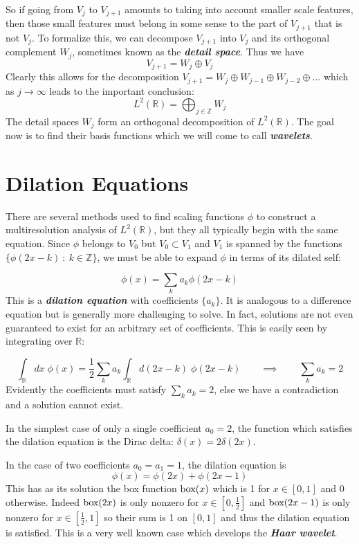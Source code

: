 \documentclass[onecolumn]{gwclass}
\begin{document}
So if going from $V_j$ to $V_{j+1}$ amounts to taking into account smaller scale features, then those small features must belong in some sense to the part of $V_{j+1}$ that is not $V_j$. To formalize this, we can decompose $V_{j+1}$ into $V_j$ and its orthogonal complement $W_j$, sometimes known as the \textbf{\emph{detail space}}. Thus we have
$$V_{j+1}=W_j\oplus V_j$$
Clearly this allows for the decomposition $V_{j+1} = W_j\oplus W_{j-1}\oplus W_{j-2}\oplus\dots$ which as $j\to\infty$ leads to the important conclusion:
$$ L^2(\mathbb{R}) = \bigoplus_{j\in\mathbb{Z}} W_j $$
The detail spaces $W_j$ form an orthogonal decomposition of $L^2(\mathbb{R})$. The goal now is to find their basis functions which we will come to call \textbf{\emph{wavelets}}. 




\section{Dilation Equations}
There are several methods used to find scaling functions $\phi$ to construct a multiresolution analysis of $L^2(\mathbb{R})$, but they all typically begin with the same equation. Since $\phi$ belongs to $V_0$ but $V_0\subset V_1$ and $V_1$ is spanned by the functions $\{\phi(2x-k)\::\:k\in\mathbb{Z}\}$, we must be able to expand $\phi$ in terms of its dilated self:

	$$\phi(x) = \sum_k a_k \phi(2x - k)$$
This is a \textbf{\emph{dilation equation}} with coefficients $\{a_k\}$. It is analogous to a difference equation but is generally more challenging to solve. In fact, solutions are not even guaranteed to exist for an arbitrary set of coefficients. This is easily seen by integrating over $\mathbb{R}$:

$$ \int_\mathbb{R}dx\;\phi(x) = \frac{1}{2}\sum_k a_k \int_\mathbb{R}d(2x-k)\;\phi(2x-k) \quad\quad\implies\quad\quad \sum_k a_k = 2$$
Evidently the coefficients must satisfy $\sum_k a_k = 2$, else we have a contradiction and a solution cannot exist.


In the simplest case of only a single coefficient $a_0=2$, the function which satisfies the dilation equation is the Dirac delta: $\delta(x)=2\delta(2x)$. 

In the case of two coefficients $a_0=a_1 = 1$, the dilation equation is
$$ \phi(x) = \phi(2x) + \phi(2x - 1) $$
This has as its solution the box function $\text{\normalfont{box}}(x)$ which is 1 for $x\in[0,1]$ and 0 otherwise. Indeed $\text{\normalfont{box}}(2x)$ is only nonzero for $x\in[0,\frac{1}{2}]$ and $\text{\normalfont{box}}(2x-1)$ is only nonzero for $x\in[\frac{1}{2},1]$ so their sum is 1 on $[0,1]$ and thus the dilation equation is satisfied. This is a very well known case which develops the \textbf{\emph{Haar wavelet}}.
\end{document}
